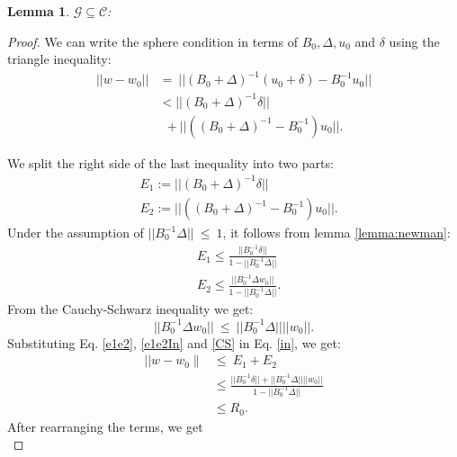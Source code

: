 \documentclass[11pt,twocolumn,varwidth=true,a4paper,fleqn]{article}
\newtheorem{lemma}{Lemma}
\begin{document}
\begin{lemma}
$\mathcal{G} \subseteq \mathcal{C}$:
\end{lemma}

\begin{proof}
We can write the sphere condition in terms of $B_0, \Delta, u_0$ and $\delta$ using the triangle
inequality:
\begin{equation} \label{in}
\begin{split}
||w-w_0|| & = \ ||(B_0+\Delta)^{-1}(u_0+\delta) - B_0^{-1}u_0|| \\
& < ||(B_0+\Delta)^{-1}\delta|| \\
& \ \ + ||((B_0+\Delta)^{-1} - B_0^{-1})u_0||.
\end{split}
\end{equation}

We split the right side of the last inequality into two parts:
\begin{equation}  \label{e1e2}
\begin{split}
& E_1:= ||(B_0+\Delta)^{-1}\delta|| \\
& E_2:= ||((B_0+\Delta)^{-1} - B_0^{-1})u_0||.
\end{split}
\end{equation}
Under the assumption of $||B_0^{-1}\Delta||\ \leq \ 1$, 
it follows from lemma \ref{lemma:newman}:
\begin{equation} \label{e1e2In}
\begin{split}
& E_1 \leq \frac{||B_0^{-1}\delta||}{1-||B_0^{-1}\Delta||} \\
& E_2 \leq  \frac{|| B_0^{-1}\Delta w_0||}{1-||B_0^{-1}\Delta||}.
\end{split}
\end{equation}
From the Cauchy-Schwarz inequality we get:
\begin{equation} \label{CS}
||B_0^{-1}\Delta w_0|| \ \leq \ ||B_0^{-1}\Delta||||w_0||.
\end{equation}
Substituting Eq. \ref{e1e2}, \ref{e1e2In} and \ref{CS} in Eq. \ref{in}, we
get:
\begin{equation}
\begin{split}
|| w-w_0 \parallel & \leq \ E_1+E_2 \\
& \leq \frac{||B_0^{-1}\delta|| + ||B_0^{-1}\Delta||||w_0||}{1 -||B_0^{-1}\Delta||} \\
& \leq R_0.
\end{split}
\end{equation}
After rearranging the terms, we get
\begin{equation} \label{lostDenom}

\end{equation}
\end{proof}
\end{document}
